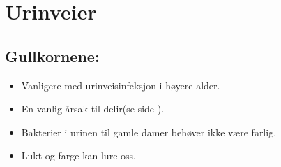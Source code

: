 \chapter{Urinveier}%
		\section{Gullkornene:}
			\begin{itemize}
				\item Vanligere med urinveisinfeksjon i høyere alder.\\
				\item En vanlig årsak til delir(se side \pageref{delir}).\\
				\item Bakterier i urinen til gamle damer behøver ikke være farlig.\\
				\item Lukt og farge kan lure oss.\\
			\end{itemize}
